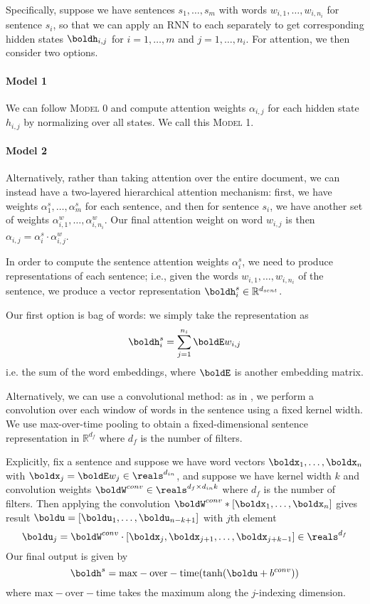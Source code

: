 \documentclass[11pt]{report}
\begin{document}
Specifically, suppose we have sentences $s_1, \ldots, s_m$ with words $w_{i,1}, \ldots, w_{i,n_i}$ for sentence $s_i$, so that we can apply an RNN to each separately to get corresponding hidden states $\boldh_{i,j}$ for $i = 1, \ldots, m$ and $j = 1, \ldots, n_i$.
For attention, we then consider two options.

\paragraph{Model 1} We can follow \textsc{Model 0} and compute attention weights $\alpha_{i,j}$ for each hidden state $h_{i,j}$ by normalizing over all states. We call this \textsc{Model 1}.

\paragraph{Model 2} Alternatively, rather than taking attention over the entire document, we can instead have a two-layered hierarchical attention mechanism: first, we have weights $\alpha_1^s, \ldots, \alpha_m^s$ for each sentence, and then for sentence $s_i$, we have another set of weights $\alpha_{i,1}^w, \ldots, \alpha_{i,n_i}^w$.
Our final attention weight on word $w_{i,j}$ is then $\alpha_{i,j} = \alpha_i^s \cdot \alpha_{i,j}^w$.

In order to compute the sentence attention weights $\alpha_i^s$, we need to produce representations of each sentence; i.e., given the words $w_{i,1}, \ldots, w_{i, n_i}$ of the sentence, we produce a vector representation $\boldh^s_i \in \mathbb{R}^{d_{sent}}$.

Our first option is bag of words: we simply take the representation as
\begin{equation}
\boldh_i^s = \sum_{j=1}^{n_i} \boldE w_{i,j}
\end{equation}
i.e. the sum of the word embeddings, where $\boldE$ is another embedding matrix.

Alternatively, we can use a convolutional method: as in \citet{kim2014convolutional}, we perform a convolution over each window of words in the sentence using a fixed kernel width. We use max-over-time pooling to obtain a fixed-dimensional sentence representation in $\mathbb{R}^{d_f}$ where $d_f$ is the number of filters.

Explicitly, fix a sentence and suppose we have word vectors $\boldx_1, \ldots, \boldx_n$ with $\boldx_j = \boldE w_j \in \reals^{d_{in}}$, and suppose we have kernel width $k$ and convolution weights $\boldW^{conv} \in \reals^{d_f \times d_{in} k}$ where $d_f$ is the number of filters. Then applying the convolution
$\boldW^{conv} * [\boldx_1, \ldots, \boldx_n]$ gives result $\boldu = [\boldu_1, \ldots, \boldu_{n-k+1}]$ with $j$th element
$$\boldu_j = \boldW^{conv} \cdot [\boldx_j, \boldx_{j+1}, \ldots, \boldx_{j+k-1}] \in \reals^{d_f}$$
Our final output is given by 
\begin{equation}
\boldh^s = \mathrm{max-over-time}(\tanh(\boldu + b^{conv}))
\end{equation}
where $\mathrm{max-over-time}$ takes the maximum along the $j$-indexing dimension.
\end{document}
